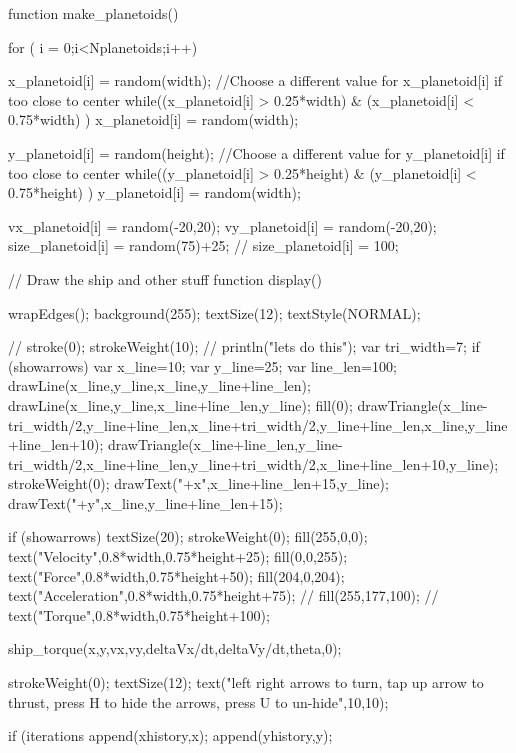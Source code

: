 \documentclass{ximera}
\begin{document}
\begin{javascriptCode}
function make_planetoids() {
  
  for ( i = 0;i<Nplanetoids;i++){

  x_planetoid[i] = random(width);
  //Choose a different value for x_planetoid[i] if too close to center
  while((x_planetoid[i] > 0.25*width) & (x_planetoid[i] < 0.75*width) ) {
  x_planetoid[i] = random(width);
  }  
  
  y_planetoid[i] = random(height);
  //Choose a different value for y_planetoid[i] if too close to center
  while((y_planetoid[i] > 0.25*height) & (y_planetoid[i] < 0.75*height) ) {
  y_planetoid[i] = random(width);
  }  

  vx_planetoid[i] = random(-20,20);
  vy_planetoid[i] = random(-20,20);
  size_planetoid[i] = random(75)+25;
//  size_planetoid[i] = 100;  
  }
}


// Draw the ship and other stuff
function display() {
    wrapEdges();
    background(255);
    textSize(12);
    textStyle(NORMAL);

//    stroke(0);
    strokeWeight(10);
//    println("lets do this");
    var tri_width=7;
    if (showarrows) {
            var x_line=10;
            var y_line=25;
            var line_len=100;
            drawLine(x_line,y_line,x_line,y_line+line_len);
            drawLine(x_line,y_line,x_line+line_len,y_line);
        fill(0);
        drawTriangle(x_line-tri_width/2,y_line+line_len,x_line+tri_width/2,y_line+line_len,x_line,y_line+line_len+10);
        drawTriangle(x_line+line_len,y_line-tri_width/2,x_line+line_len,y_line+tri_width/2,x_line+line_len+10,y_line);
            strokeWeight(0);
            drawText("+x",x_line+line_len+15,y_line);
            drawText("+y",x_line,y_line+line_len+15);
    }

    if (showarrows) {
    textSize(20);
    strokeWeight(0);
    fill(255,0,0);
    text("Velocity",0.8*width,0.75*height+25);
    fill(0,0,255);
    text("Force",0.8*width,0.75*height+50);
    fill(204,0,204);
    text("Acceleration",0.8*width,0.75*height+75);
//    fill(255,177,100);
//    text("Torque",0.8*width,0.75*height+100);  
    }

    ship_torque(x,y,vx,vy,deltaVx/dt,deltaVy/dt,theta,0);

    strokeWeight(0);
    textSize(12);
    text("left right arrows to turn, tap up arrow to thrust, press H to hide the arrows, press U to un-hide",10,10);

  
      if (iterations%
    append(xhistory,x);
    append(yhistory,y);
    }


\end{javascriptCode}
\end{document}
